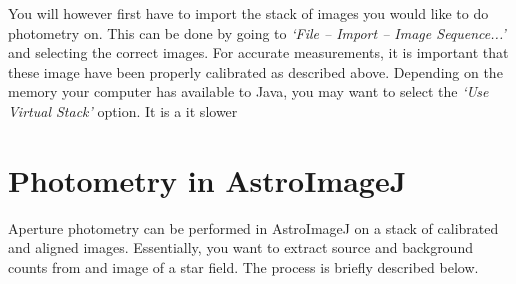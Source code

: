 \documentclass[12pt,twoside,a4paper]{report}
\begin{document}
You will however first have to import the stack of images you would like to do photometry on. This can be done by going to \emph{`File -- Import -- Image Sequence...'} and selecting the correct images. For accurate measurements, it is important that these image have been properly calibrated as described above. Depending on the memory your computer has available to Java, you may want to select the \emph{`Use Virtual Stack'} option. It is a it slower 


\section{Photometry in AstroImageJ}
\label{AIJ_Photometry}
Aperture photometry can be performed in AstroImageJ on a stack of calibrated and aligned images. Essentially, you want to extract source and background counts from and image of a star field. The process is briefly described below.
\end{document}
